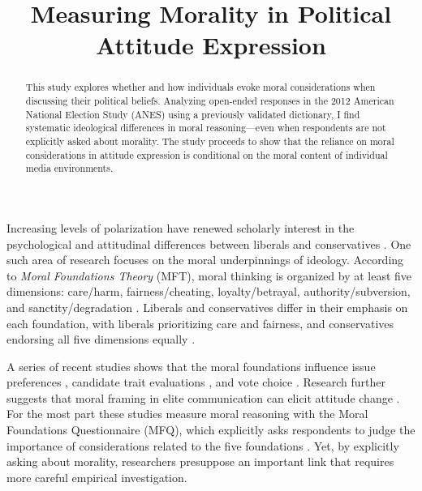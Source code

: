 \documentclass[12pt]{article}
\date{}
\title{Measuring Morality in Political Attitude Expression
}
\begin{document}
\maketitle
\doublespacing
\thispagestyle{empty}

\begin{abstract}
This study explores whether and how individuals evoke moral considerations when discussing their political beliefs. Analyzing open-ended responses in the 2012 American National Election Study (ANES) using a previously validated dictionary, I find systematic ideological differences in moral reasoning---even when respondents are not explicitly asked about morality. The study proceeds to show that the reliance on moral considerations in attitude expression is conditional on the moral content of individual media environments.

\end{abstract}
\newpage
\setcounter{page}{1}

Increasing levels of polarization have renewed scholarly interest in the psychological and attitudinal differences between liberals and conservatives \citep{jost2006end}. One such area of research focuses on the moral underpinnings of ideology. According to \textit{Moral Foundations Theory} (MFT), moral thinking is organized by at least five dimensions: care/harm, fairness/cheating, loyalty/betrayal, authority/subversion, and sanctity/degradation \citep{graham2013moral}. Liberals and conservatives differ in their emphasis on each foundation, with liberals prioritizing care and fairness, and conservatives endorsing all five dimensions equally \citep{graham2009liberals}.


A series of recent studies shows that the moral foundations influence issue preferences \citep{kertzer2014moral}, candidate trait evaluations \citep{clifford2014linking}, and vote choice \citep{iyer2010beyond}. Research further suggests that moral framing in elite communication can elicit attitude change \citep[e.g.][]{clifford2015concerns,feinberg2013moral}. For the most part these studies measure moral reasoning with the Moral Foundations Questionnaire (MFQ), which explicitly asks respondents to judge the importance of considerations related to the five foundations \citep[e.g.][]{graham2011mapping}. Yet, by explicitly asking about morality, researchers presuppose an important link that requires more careful empirical investigation.
\end{document}
